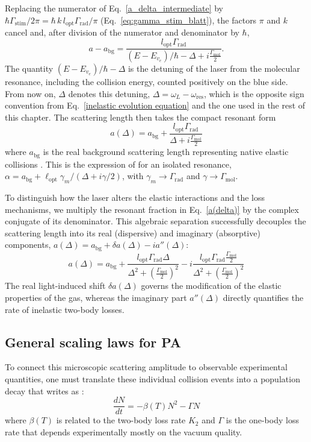 Replacing the numerator of Eq.~\ref{a_delta_intermediate} by
$\hbar\Gamma_{\text{stim}}/2\pi=\hbar\,k\,l_{\text{opt}}\Gamma_{\text{rad}}/\pi$
(Eq.~\ref{eq:gamma_stim_blatt}), the factors $\pi$ and $k$ cancel and, after division
of the numerator and denominator by $\hbar$,
$$a-a_{\text{bg}}=\frac{l_{\text{opt}}\Gamma_{\text{rad}}}
{(E-E_{v_e})/\hbar-\Delta+i\frac{\Gamma_{\text{mol}}}{2}}.$$
The quantity $(E-E_{v_e})/\hbar-\Delta$ is the detuning of the laser from the molecular
resonance, including the collision energy, counted positively on the blue side. From
now on, $\Delta$ denotes this detuning, $\Delta=\omega_L-\omega_{\text{res}}$, which is
the opposite sign convention from Eq.~\ref{inelastic evolution equation} and the one
used in the rest of this chapter. The scattering length then takes the compact
resonant form
\begin{equation}
a(\Delta) = a_{\text{bg}} + \frac{l_{\text{opt}}\Gamma_{\text{rad}}}{\Delta + i\frac{\Gamma_{\text{mol}}}{2}}
\label{a(delta)}
\end{equation}
where $a_{\text{bg}}$ is the real background scattering length representing native elastic collisions \cite{yan_controlling_2013}.
This is the expression of \cite{blatt_systematic_2011} for an isolated resonance,
$\alpha=a_{\text{bg}}+\ell_{\text{opt}}\gamma_m/(\Delta+i\gamma/2)$, with $\gamma_m\to\Gamma_{\text{rad}}$ and $\gamma\to\Gamma_{\text{mol}}$.

To distinguish how the laser alters the elastic interactions and the loss mechanisms, we multiply the resonant fraction in Eq.~\ref{a(delta)} by the complex conjugate of its denominator. This algebraic
 separation successfully decouples the scattering length into its real (dispersive) and imaginary (absorptive) components, $a(\Delta) = a_{\text{bg}} + \delta a(\Delta) - i a''(\Delta)$:
\begin{equation}
    a(\Delta) = a_{\text{bg}} + \frac{l_{\text{opt}}\Gamma_{\text{rad}}\Delta}{\Delta^2 + \left(\frac{\Gamma_{\text{mol}}}{2}\right)^2} - i \frac{l_{\text{opt}}\Gamma_{\text{rad}}\frac{\Gamma_{\text{mol}}}{2}}
    {\Delta^2 + \left(\frac{ \Gamma_{\text{mol}}}{2}\right)^2}
\end{equation}
The real light-induced shift $\delta a(\Delta)$ governs the modification of the elastic properties of the gas, whereas the imaginary part $a''(\Delta)$ directly quantifies the rate of inelastic two-body losses.
\subsection{General scaling laws for PA}
\label{sec:scaling_laws}
To connect this microscopic scattering amplitude to observable experimental quantities, one must translate these individual collision events into a population decay that writes as 
\cite{martinez_de_escobar_two-photon_2008}:
\begin{equation}
    \frac{dN}{dt} = -\beta(T) N^2 - \Gamma N
\end{equation}
where $\beta(T)$ is related to the two-body loss rate $K_2$ and $\Gamma$ is the one-body loss rate that depends experimentally mostly on the vacuum quality.\\

